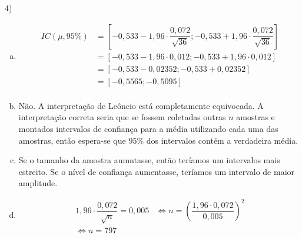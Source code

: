 \documentclass[12pt]{article}
\begin{document}
\vspace{5px}
4) 
\begin{enumerate}[a)]
    \item 
    \begin{align*}
        IC(\mu, 95\%) &= [-0,533 - 1,96 \cdot \dfrac{0,072}{\sqrt{36}} ; -0,533 + 1,96 \cdot \dfrac{0,072}{\sqrt{36}}]\\
        &=[-0,533 - 1,96 \cdot 0,012 ; -0,533 + 1,96 \cdot 0,012]\\
        &=[-0,533 - 0,02352 ; -0,533 + 0,02352]\\
        &=[-0,5565 ; -0,5095]\\
    \end{align*}
    

    \item Não. A interpretação de Leôncio está completamente equivocada. A interpretação correta seria que se fossem coletadas outras $n$ amostras e montados intervalos de confiança para a média utilizando cada uma das amostras, então espera-se que $95\%$
    dos intervalos contém a verdadeira média. 

    \item Se o tamanho da amostra aumntasse, então teríamos um intervalos mais estreito. Se o nível de confiança aumentasse, teríamos um intervalo de maior amplitude. 
    

    \item  \begin{align*}
        1,96 \cdot \dfrac{0,072}{\sqrt{n}} = 0,005 &\iff n =   \left(\dfrac{1,96 \cdot 0,072}{ 0,005}\right)^2\\
        \iff n = 797
    \end{align*}
\end{enumerate}

\vspace{5px}
\end{document}
